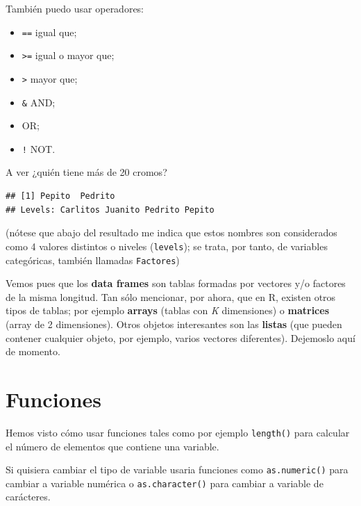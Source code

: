 \documentclass[]{book}
\newenvironment{Shaded}{\begin{snugshade}}{\end{snugshade}}
\newcommand{\DecValTok}[1]{\textcolor[rgb]{0.00,0.00,0.81}{{#1}}}
\newcommand{\NormalTok}[1]{{#1}}
\providecommand{\tightlist}{%
  \setlength{\itemsep}{0pt}\setlength{\parskip}{0pt}}
\theoremstyle{definition}
\theoremstyle{definition}
\theoremstyle{remark}
\begin{document}
También puedo usar operadores:

\begin{itemize}
\tightlist
\item
  \texttt{==} igual que;
\item
  \texttt{\textgreater{}=} igual o mayor que;
\item
  \texttt{\textgreater{}} mayor que;
\item
  \texttt{\&} AND;
\item
  \texttt{\textbar{}} OR;
\item
  \texttt{!} NOT.
\end{itemize}

A ver ¿quién tiene más de 20 cromos?

\begin{Shaded}
\end{Shaded}

\begin{verbatim}
## [1] Pepito  Pedrito
## Levels: Carlitos Juanito Pedrito Pepito
\end{verbatim}

(nótese que abajo del resultado me indica que estos nombres son
considerados como 4 valores distintos o niveles (\texttt{levels}); se
trata, por tanto, de variables categóricas, también llamadas
\texttt{Factores})

Vemos pues que los \textbf{data frames} son tablas formadas por vectores
y/o factores de la misma longitud. Tan sólo mencionar, por ahora, que en
R, existen otros tipos de tablas; por ejemplo \textbf{arrays} (tablas
con \emph{K} dimensiones) o \textbf{matrices} (array de 2 dimensiones).
Otros objetos interesantes son las \textbf{listas} (que pueden contener
cualquier objeto, por ejemplo, varios vectores diferentes). Dejemoslo
aquí de momento.

\section{Funciones}\label{funciones}

Hemos visto cómo usar funciones tales como por ejemplo \texttt{length()}
para calcular el número de elementos que contiene una variable.

Si quisiera cambiar el tipo de variable usaria funciones como
\texttt{as.numeric()} para cambiar a variable numérica o
\texttt{as.character()} para cambiar a variable de carácteres.
\end{document}
